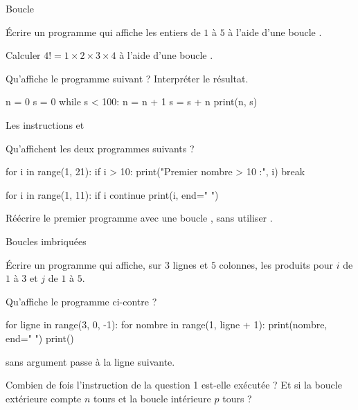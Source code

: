 \begin{exercice}[1]{Boucle }
\begin{questions}
  \item Écrire un programme qui affiche les entiers de $1$ à $5$ à l'aide d'une boucle .
  \item Calculer $4!=1\times2\times3\times4$ à l'aide d'une boucle .
  \item Qu'affiche le programme suivant ? Interpréter le résultat.
\begin{python}
n = 0
s = 0
while s < 100:
    n = n + 1
    s = s + n
print(n, s)
\end{python}
\end{questions}
\end{exercice}


\begin{exercice}[2]{Les instructions  et }
\begin{questions}
  \item Qu'affichent les deux programmes suivants ?
\begin{codecote}[0.58]
\begin{pythoncol}
for i in range(1, 21):
    if i > 10:
        print("Premier nombre > 10 :", i)
        break
\end{pythoncol}
\cote
\begin{pythoncol}
for i in range(1, 11):
    if i %
        continue
    print(i, end=" ")
\end{pythoncol}
\end{codecote}
  \item Réécrire le premier programme avec une boucle , sans utiliser .
\end{questions}
\end{exercice}

\begin{exercice}[2]{Boucles imbriquées}
\begin{questions}
  \item Écrire un programme qui affiche, sur $3$ lignes et $5$ colonnes, les produits  pour $i$ de $1$ à $3$ et $j$ de $1$
    à $5$.
  \item Qu'affiche le programme ci-contre ?
\begin{codecote}[0.57]
\begin{pythoncol}
for ligne in range(3, 0, -1):
    for nombre in range(1, ligne + 1):
        print(nombre, end=" ")
    print()
\end{pythoncol}
\cote
{} sans argument passe à la ligne suivante.
\end{codecote}
  \item Combien de fois l'instruction  de la question 1 est-elle exécutée ? Et si la boucle extérieure
    compte $n$ tours et la boucle intérieure $p$ tours ?
\end{questions}
\end{exercice}

